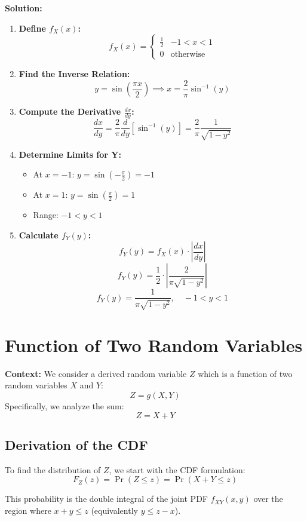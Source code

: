 \documentclass[12pt]{article}
\begin{document}
\textbf{Solution:}
\begin{enumerate}
    \item \textbf{Define $f_X(x)$:}
    $$ f_X(x) = \begin{cases} \frac{1}{2} & -1 < x < 1 \\ 0 & \text{otherwise} \end{cases} $$
    
    \item \textbf{Find the Inverse Relation:}
    $$ y = \sin\left(\frac{\pi x}{2}\right) \implies x = \frac{2}{\pi} \sin^{-1}(y) $$
    
    \item \textbf{Compute the Derivative $\frac{dx}{dy}$:}
    $$ \frac{dx}{dy} = \frac{2}{\pi} \frac{d}{dy}[\sin^{-1}(y)] = \frac{2}{\pi} \frac{1}{\sqrt{1-y^2}} $$
    
    \item \textbf{Determine Limits for Y:}
    \begin{itemize}
        \item At $x = -1$: $y = \sin(-\frac{\pi}{2}) = -1$
        \item At $x = 1$: $y = \sin(\frac{\pi}{2}) = 1$
        \item Range: $-1 < y < 1$
    \end{itemize}
    
    \item \textbf{Calculate $f_Y(y)$:}
    $$ f_Y(y) = f_X(x) \cdot \left| \frac{dx}{dy} \right| $$
    $$ f_Y(y) = \frac{1}{2} \cdot \left| \frac{2}{\pi \sqrt{1-y^2}} \right| $$
    $$ f_Y(y) = \frac{1}{\pi \sqrt{1-y^2}}, \quad -1 < y < 1 $$
\end{enumerate}

\section{Function of Two Random Variables}
\textbf{Context:} We consider a derived random variable $Z$ which is a function of two random variables $X$ and $Y$:
$$ Z = g(X, Y) $$
Specifically, we analyze the sum:
$$ Z = X + Y $$

\subsection*{Derivation of the CDF}
To find the distribution of $Z$, we start with the CDF formulation:
$$ F_Z(z) = \Pr(Z \le z) = \Pr(X + Y \le z) $$

This probability is the double integral of the joint PDF $f_{XY}(x, y)$ over the region where $x + y \le z$ (equivalently $y \le z - x$).
\end{document}
